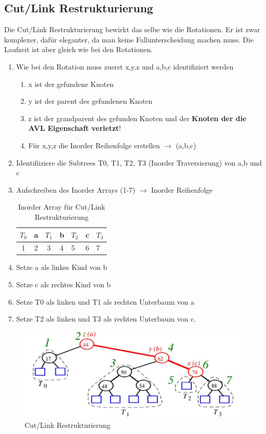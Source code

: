 \subsection{Cut/Link Restrukturierung}
Die Cut/Link Restrukturierung bewirkt das selbe wie die Rotationen. Er ist zwar komplexer, dafür eleganter, da man keine Fallunterscheidung machen muss. Die Laufzeit ist aber gleich wie bei den Rotationen.
\begin{enumerate}
	\item Wie bei den Rotation muss zuerst x,y,z und a,b,c identifiziert werden
	\begin{enumerate}
		\item x ist der gefundene Knoten
		\item y ist der parent des gefundenen Knoten
		\item z ist der grandparent des gefunden Knoten und der \textbf{Knoten der die AVL Eigenschaft verletzt}!
		\item Für x,y,z die Inorder Reihenfolge erstellen $\rightarrow$ (a,b,c)
	\end{enumerate}
	\item Identifiiziere die Subtrees T0, T1, T2, T3 (Inorder Traversierung) von a,b und c
	\item Aufschreiben des Inorder Arrays (1-7) $\rightarrow$ Inorder Reihenfolge
	\begin{table}[h]
		\centering
		\begin{tabu} to \linewidth {| c | c | c | c | l | l | l |}
			\toprule
			$T_0$ & a & $T_1$ & b & $T_2$ & c & $T_3$ \\  & 2 & 3 & 4 & 5 & 6 & 7 \\
			\bottomrule
		\end{tabu}
		\caption{Inorder Array für Cut/Link Restrukturierung}
	\end{table}
	\item Setze a als linkes Kind von b
	\item Setze c als rechtes Kind von b
	\item Setze T0 als linken und  T1 als rechten Unterbaum von a
	\item Setze T2 als linken  und T3 als rechten Unterbaum von c.
\end{enumerate}


\begin{figure}[h]
\centering
\includegraphics[width=0.8\linewidth]{images/cut_link_restruction}
\caption{Cut/Link Restrukturierung}
\label{fig:cutlinkrestruction}
\end{figure}

